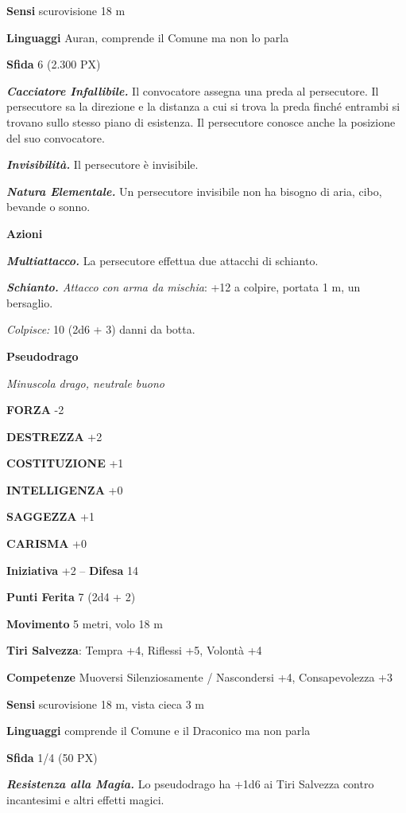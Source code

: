\begin{multicols}{2}
\textbf{Sensi} scurovisione 18 m

\textbf{Linguaggi} Auran, comprende il Comune ma non lo parla

\textbf{Sfida} 6 (2.300 PX)

\textit{\textbf{Cacciatore Infallibile.}} Il convocatore assegna una preda al persecutore. Il persecutore sa la direzione e la distanza a cui si trova la preda finché entrambi si trovano sullo stesso piano di esistenza. Il persecutore conosce anche la posizione del suo convocatore.

\textit{\textbf{Invisibilità.}} Il persecutore è invisibile.

\textit{\textbf{Natura Elementale.}} Un persecutore invisibile non ha bisogno di aria, cibo, bevande o sonno.

\textbf{Azioni}

\textit{\textbf{Multiattacco.}} La persecutore effettua due attacchi di schianto.



\textit{\textbf{Schianto.} Attacco con arma da mischia}: +12 a colpire, portata 1 m, un bersaglio.

\textit{Colpisce:} 10 (2d6 + 3) danni da botta.

\medskip{}\textbf{Pseudodrago}

\textit{Minuscola drago, neutrale buono}

\textbf{FORZA} -2

\textbf{DESTREZZA} +2

\textbf{COSTITUZIONE} +1

\textbf{INTELLIGENZA} +0

\textbf{SAGGEZZA} +1

\textbf{CARISMA} +0

\textbf{Iniziativa} +2 -- \textbf{Difesa} 14

\textbf{Punti Ferita} 7 (2d4 + 2)

\textbf{Movimento} 5 metri, volo 18 m

\textbf{Tiri Salvezza}: Tempra +4, Riflessi +5, Volontà +4

\textbf{Competenze} Muoversi Silenziosamente / Nascondersi +4, Consapevolezza +3

\textbf{Sensi} scurovisione 18 m, vista cieca 3 m

\textbf{Linguaggi} comprende il Comune e il Draconico ma non parla

\textbf{Sfida} 1/4 (50 PX)

\textit{\textbf{Resistenza alla Magia.}} Lo pseudodrago ha +1d6 ai Tiri Salvezza contro incantesimi e altri effetti magici.


\end{multicols}
